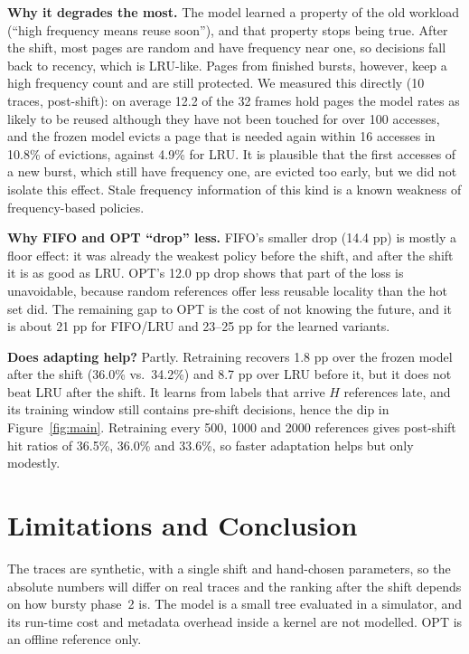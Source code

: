 \documentclass[10pt,a4paper]{article}
\begin{document}
\textbf{Why it degrades the most.} The model learned a property of the old workload (``high frequency means reuse soon''), and that property stops being true. After the shift, most pages are random and have frequency near one, so decisions fall back to recency, which is LRU-like. Pages from finished bursts, however, keep a high frequency count and are still protected. We measured this directly (10 traces, post-shift): on average 12.2 of the 32 frames hold pages the model rates as likely to be reused although they have not been touched for over 100 accesses, and the frozen model evicts a page that is needed again within 16 accesses in 10.8\% of evictions, against 4.9\% for LRU. It is plausible that the first accesses of a new burst, which still have frequency one, are evicted too early, but we did not isolate this effect. Stale frequency information of this kind is a known weakness of frequency-based policies.

\textbf{Why FIFO and OPT ``drop'' less.} FIFO's smaller drop (14.4 pp) is mostly a floor effect: it was already the weakest policy before the shift, and after the shift it is as good as LRU. OPT's 12.0 pp drop shows that part of the loss is unavoidable, because random references offer less reusable locality than the hot set did. The remaining gap to OPT is the cost of not knowing the future, and it is about 21 pp for FIFO/LRU and 23--25 pp for the learned variants.

\textbf{Does adapting help?} Partly. Retraining recovers 1.8 pp over the frozen model after the shift (36.0\% vs.\ 34.2\%) and 8.7 pp over LRU before it, but it does not beat LRU after the shift. It learns from labels that arrive $H$ references late, and its training window still contains pre-shift decisions, hence the dip in Figure~\ref{fig:main}. Retraining every 500, 1000 and 2000 references gives post-shift hit ratios of 36.5\%, 36.0\% and 33.6\%, so faster adaptation helps but only modestly.

\section{Limitations and Conclusion}
The traces are synthetic, with a single shift and hand-chosen parameters, so the absolute numbers will differ on real traces and the ranking after the shift depends on how bursty phase~2 is. The model is a small tree evaluated in a simulator, and its run-time cost and metadata overhead inside a kernel are not modelled. OPT is an offline reference only.
\end{document}
